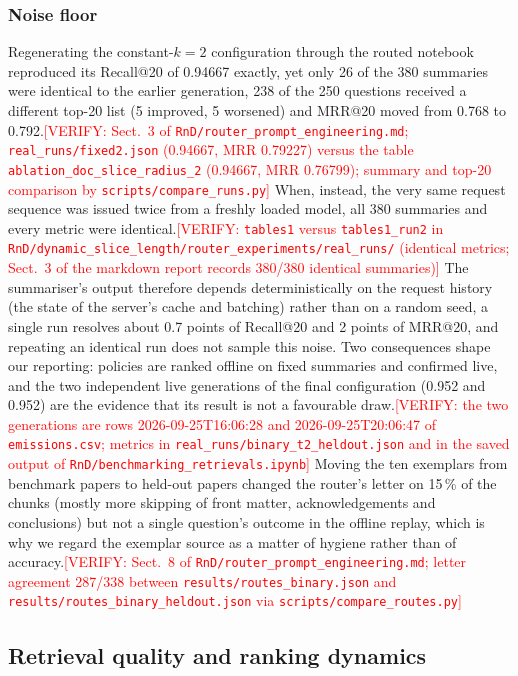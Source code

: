 \documentclass[pdflatex,sn-mathphys-num]{sn-jnl}
\makeatletter
\newcommand{\todo}[1]{\textcolor{red}{#1}}
\newcommand{\verify}[1]{\todo{[VERIFY: #1]}}
\newcommand{\Rec}[1]{Recall@#1}
\newcommand{\MRR}[1]{MRR@#1}
\theoremstyle{thmstyleone}%
\theoremstyle{thmstylethree}%
\makeatother
\begin{document}
\subsubsection{Noise floor}
Regenerating the constant-$k=2$ configuration through the routed notebook reproduced its \Rec{20} of 0.94667 exactly, yet only 26 of the 380 summaries were identical to the earlier generation, 238 of the 250 questions received a different top-20 list (5 improved, 5 worsened) and \MRR{20} moved from 0.768 to 0.792.\verify{Sect.~3 of \texttt{RnD/router\_prompt\_engineering.md}; \texttt{real\_runs/fixed2.json} (0.94667, MRR 0.79227) versus the table \texttt{ablation\_doc\_slice\_radius\_2} (0.94667, MRR 0.76799); summary and top-20 comparison by \texttt{scripts/compare\_runs.py}} When, instead, the very same request sequence was issued twice from a freshly loaded model, all 380 summaries and every metric were identical.\verify{\texttt{tables1} versus \texttt{tables1\_run2} in \texttt{RnD/dynamic\_slice\_length/router\_experiments/real\_runs/} (identical metrics; Sect.~3 of the markdown report records 380/380 identical summaries)} The summariser's output therefore depends deterministically on the request history (the state of the server's cache and batching) rather than on a random seed, a single run resolves about 0.7 points of \Rec{20} and 2 points of \MRR{20}, and repeating an identical run does not sample this noise. Two consequences shape our reporting: policies are ranked offline on fixed summaries and confirmed live, and the two independent live generations of the final configuration (0.952 and 0.952) are the evidence that its result is not a favourable draw.\verify{the two generations are rows 2026-09-25T16:06:28 and 2026-09-25T20:06:47 of \texttt{emissions.csv}; metrics in \texttt{real\_runs/binary\_t2\_heldout.json} and in the saved output of \texttt{RnD/benchmarking\_retrievals.ipynb}} Moving the ten exemplars from benchmark papers to held-out papers changed the router's letter on 15\,\% of the chunks (mostly more skipping of front matter, acknowledgements and conclusions) but not a single question's outcome in the offline replay, which is why we regard the exemplar source as a matter of hygiene rather than of accuracy.\verify{Sect.~8 of \texttt{RnD/router\_prompt\_engineering.md}; letter agreement 287/338 between \texttt{results/routes\_binary.json} and \texttt{results/routes\_binary\_heldout.json} via \texttt{scripts/compare\_routes.py}}

\subsection{Retrieval quality and ranking dynamics}\label{sec:ranking}
\end{document}
